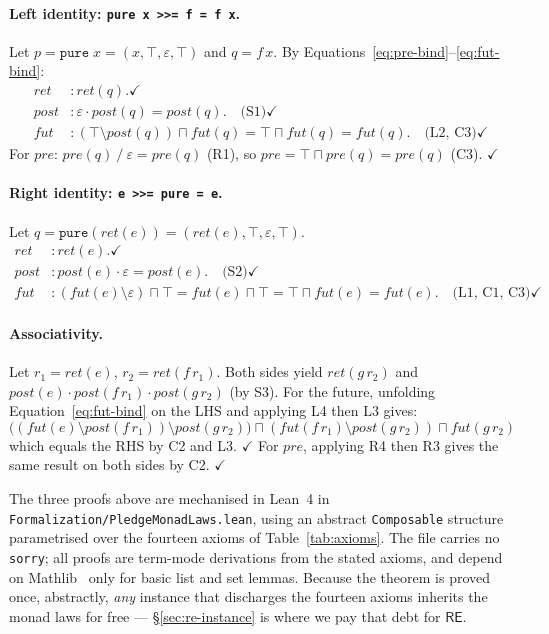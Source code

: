 \documentclass[acmsmall,screen]{acmart}
\newcommand{\RE}{\mathsf{RE}}
\newcommand{\pre}{\mathit{pre}}
\newcommand{\post}{\mathit{post}}
\newcommand{\fut}{\mathit{fut}}
\newcommand{\ret}{\mathit{ret}}
\newcommand{\lquot}{\mathbin{\setminus}}   %
\newcommand{\rquot}{\mathbin{/}}           %
\begin{document}
\paragraph{Left identity: \lstinline{pure x >>= f = f x}.}
Let $p = \mathtt{pure}\;x = (x, \top, \varepsilon, \top)$ and $q = f\,x$.
By Equations~\eqref{eq:pre-bind}--\eqref{eq:fut-bind}:
\begin{align*}
  \ret  &: \ret(q). \checkmark \\
  \post &: \varepsilon \cdot \post(q) = \post(q). \quad\text{(S1)} \checkmark \\
  \fut  &: (\top \lquot \post(q)) \sqcap \fut(q)
         = \top \sqcap \fut(q) = \fut(q). \quad\text{(L2, C3)} \checkmark
\end{align*}
For $\pre$: $\pre(q) \rquot \varepsilon = \pre(q)$ (R1), so $\pre = \top \sqcap \pre(q)
= \pre(q)$ (C3). $\checkmark$

\paragraph{Right identity: \lstinline{e >>= pure = e}.}
Let $q = \mathtt{pure}(\ret(e)) = (\ret(e), \top, \varepsilon, \top)$.
\begin{align*}
  \ret  &: \ret(e). \checkmark \\
  \post &: \post(e) \cdot \varepsilon = \post(e). \quad\text{(S2)} \checkmark \\
  \fut  &: (\fut(e) \lquot \varepsilon) \sqcap \top
         = \fut(e) \sqcap \top = \top \sqcap \fut(e) = \fut(e). \quad\text{(L1, C1, C3)} \checkmark
\end{align*}

\paragraph{Associativity.}
Let $r_1 = \ret(e)$, $r_2 = \ret(f\,r_1)$.
Both sides yield $\ret(g\,r_2)$ and
$\post(e) \cdot \post(f\,r_1) \cdot \post(g\,r_2)$ (by S3).
For the future, unfolding Equation~\eqref{eq:fut-bind} on the LHS and
applying L4 then L3 gives:
\[
  \bigl((\fut(e) \lquot \post(f\,r_1)) \lquot \post(g\,r_2)\bigr) \sqcap
  (\fut(f\,r_1) \lquot \post(g\,r_2)) \sqcap \fut(g\,r_2)
\]
which equals the RHS by C2 and L3. $\checkmark$
For $\pre$, applying R4 then R3 gives the same result on both sides by C2. $\checkmark$

The three proofs above are mechanised in Lean~4 in
\texttt{Formalization/PledgeMonadLaws.lean}, using an abstract
\lstinline{Composable} structure parametrised over the fourteen axioms of
Table~\ref{tab:axioms}.
The file carries no \lstinline{sorry}; all proofs are term-mode derivations
from the stated axioms, and depend on Mathlib~\cite{mathlib4} only for
basic list and set lemmas.
Because the theorem is proved once, abstractly, \emph{any} instance that
discharges the fourteen axioms inherits the monad laws for free ---
\S\ref{sec:re-instance} is where we pay that debt for $\RE$.
\end{document}
